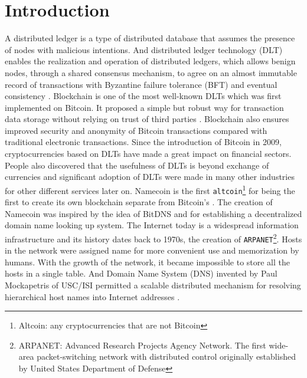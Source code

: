 \section{Introduction}
\label{sec:introduction}

A distributed ledger is a type of distributed database that assumes the presence of nodes with malicious intentions.
And distributed ledger technology (DLT) enables the realization and operation of distributed ledgers,
which allows benign nodes, through a shared consensus mechanism, to agree on an almost immutable record of transactions with Byzantine failure tolerance (BFT) and eventual consistency \cite{Sunyaev2020}.
Blockchain is one of the most well-known DLTs which was first implemented on Bitcoin. It proposed a simple but robust way for transaction data storage without relying on trust of third parties \cite{nakamoto2008peer}.
Blockchain also ensures improved security and anonymity of Bitcoin transactions compared with traditional electronic transactions.
Since the introduction of Bitcoin in 2009, cryptocurrencies based on DLTs have made a great impact on financial sectors. People also discovered that the usefulness of DLTs is beyond exchange of currencies and
significant adoption of DLTs were made in many other industries for other different services later on. Namecoin is the first \texttt{altcoin}\footnote{Altcoin: any cryptocurrencies that are not Bitcoin} for being the first to create its own blockchain separate from Bitcoin's \cite{kalodner2015empirical}.
The creation of Namecoin was inspired by the idea of BitDNS \cite{merited2010bitdns} and for establishing a decentralized domain name looking up system.
The Internet today is a widespread information infrastructure and its history dates back to 1970s, the creation of \texttt{ARPANET}\footnote{ARPANET: Advanced Research Projects Agency Network. The first wide-area packet-switching network with distributed control originally established by United States Department of Defense}.
Hosts in the network were assigned name for more convenient use and memorization by humans. With the growth of the network, it became impossible to store all the hosts in a single table. 
And Domain Name System (DNS) invented by Paul Mockapetris of USC/ISI permitted a scalable distributed mechanism for resolving hierarchical host names into Internet addresses \cite{leiner2009brief}.